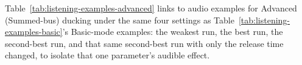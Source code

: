 %
%

\noindent Table~\ref{tab:listening-examples-advanced} links to audio
examples for Advanced (Summed-bus) ducking under the same four settings as
Table~\ref{tab:listening-examples-basic}'s Basic-mode examples: the
weakest run, the best run, the second-best run, and that same second-best
run with only the release time changed, to isolate that one parameter's
audible effect.

